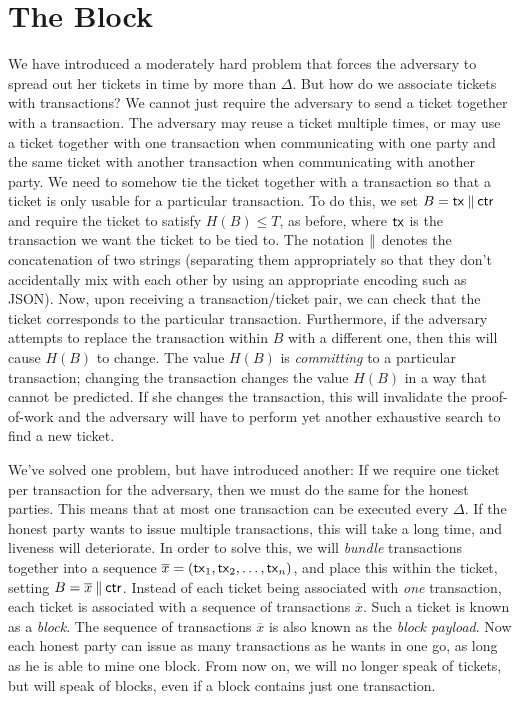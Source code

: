 \section{The Block}

We have introduced a moderately hard problem that forces the adversary to spread out her
tickets in time by more than $\Delta$. But how do we associate tickets with transactions?
We cannot just require the adversary to send a ticket together with a transaction.
The adversary may reuse a ticket multiple times, or may use a ticket together with one transaction
when communicating with one party and the same ticket with another transaction when
communicating with another party. We need to somehow tie the ticket together with a
transaction so that a ticket is only usable for a particular transaction.
To do this, we set $B = \mathsf{tx} \mathbin{\|} \mathsf{ctr}$ and require the ticket to satisfy $H(B) \leq T$,
as before, where $\mathsf{tx}$ is the transaction we want the ticket to be tied to.
The notation $\mathbin{\|}$ denotes the concatenation of two strings (separating them appropriately
so that they don't accidentally mix with each other by using an appropriate encoding such
as JSON).
Now, upon receiving a transaction/ticket pair, we can check that the ticket corresponds
to the particular transaction. Furthermore, if the adversary attempts to replace the
transaction within $B$ with a different one, then this will cause $H(B)$ to change.
The value $H(B)$ is \emph{committing} to a particular transaction; changing the transaction
changes the value $H(B)$ in a way that cannot be predicted. If she changes the transaction,
this will invalidate the proof-of-work and the adversary will have to perform yet another
exhaustive search to find a new ticket.

We've solved one problem, but have introduced another: If we require one ticket per transaction
for the adversary, then we must do the same for the honest parties. This means that at most one
transaction can be executed every $\Delta$. If the honest party wants to issue multiple transactions,
this will take a long time, and liveness will deteriorate. In order to solve this, we will \emph{bundle}
transactions together into a sequence $\overline{x} = (\mathsf{tx}_1, \mathsf{tx}_2, \ldots, \mathsf{tx}_n)$, and place
this within the ticket, setting $B = \overline{x} \mathbin{\|} \mathsf{ctr}$.
Instead of each ticket being associated with \emph{one} transaction, each ticket
is associated with a sequence of transactions $\overline{x}$.
Such a ticket is known as a \emph{block}.
The sequence of transactions $\overline{x}$ is also known as the \emph{block payload}.
Now each honest party can issue as many transactions
as he wants in one go, as long as he is able to mine one block.
From now on, we will no longer speak of tickets, but will speak of blocks,
even if a block contains just one transaction.

